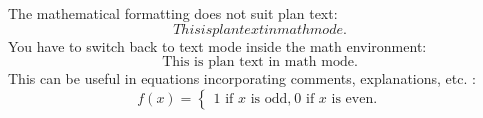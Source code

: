 \documentclass[a4paper]{article}
\begin{document}

The mathematical formatting does not suit plan text:
\begin{equation}
	This is plan text in math mode.
\end{equation}
You have to switch back to text mode inside the math environment:
\begin{equation}
	\textrm{This is plan text in math mode.}
\end{equation}
This can be useful in equations incorporating comments, explanations, etc. :
\begin{equation}
	f(x) = \left\{ \begin{array}{l} \textrm{$1$ if $x$ is odd,} \
\textrm{$0$ if $x$ is even.} \end{array}\right.
\end{equation}
\end{document}
